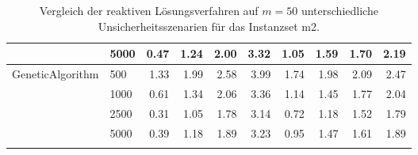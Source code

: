 {\begin{longtable}{ll|rrrr|rrrr}
                 & 5000 & 0.47 & 1.24 & 2.00 & 3.32 & 1.05 & 1.59 & 1.70 & 2.19 \\ \hline
GeneticAlgorithm & 500  & 1.33 & 1.99 & 2.58 & 3.99 & 1.74 & 1.98 & 2.09 & 2.47 \\
                 & 1000 & 0.61 & 1.34 & 2.06 & 3.36 & 1.14 & 1.45 & 1.77 & 2.04 \\
                 & 2500 & 0.31 & 1.05 & 1.78 & 3.14 & 0.72 & 1.18 & 1.52 & 1.79 \\
                 & 5000 & 0.39 & 1.18 & 1.89 & 3.23 & 0.95 & 1.47 & 1.61 & 1.89 \\
\bottomrule
\caption{Vergleich der reaktiven Lösungsverfahren auf $m=50$ unterschiedliche Unsicherheitsszenarien für das Instanzset m2. }
\label{tab:evaluation_reactive_m2}
\end{longtable}
}
\vspace*{-25px}
\begin{figure}[H]
\end{figure}


